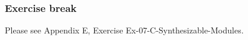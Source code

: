 
\begin{frame}
\frametitle{\EmojiExercise \hmm Exercise break}

Please see Appendix E, Exercise Ex-07-C-Synthesizable-Modules.

\end{frame}






